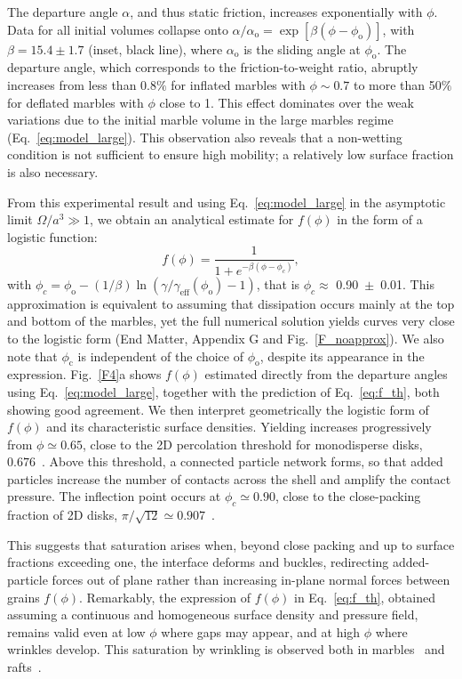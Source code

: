 \documentclass[twocolumn, prl,
 amsmath,amssymb,
 superscriptaddress,aps,
]{revtex4-2}
\begin{document}
The departure angle $\alpha$, and thus static friction, increases exponentially with $\phi$. Data for all initial volumes collapse onto $\alpha / \alpha_\mathrm{o} = \exp[\beta(\phi - \phi_\mathrm{o})]$, with $\beta = 15.4 \pm 1.7$ (inset, black line), where $\alpha_\mathrm{o}$ is the sliding angle at $\phi_\mathrm{o}$.
The departure angle, which corresponds to the friction-to-weight ratio, abruptly increases from less than 0.8$\%$ for inflated marbles with $\phi \sim 0.7$ to more than 50$\%$ for deflated marbles with $\phi$ close to 1.
This effect dominates over the weak variations due to the initial marble volume in the large marbles regime (Eq.~\ref{eq:model_large}). This observation also reveals that a non-wetting condition is not sufficient to ensure high mobility; a relatively low surface fraction is also necessary.

From this experimental result and using Eq.~\ref{eq:model_large} in the asymptotic limit $\Omega/a^3\gg 1$, we obtain an analytical estimate for $f(\phi)$ in the form of a logistic function:
\begin{equation}
    f(\phi) = \frac{1}{1+e^{-\beta(\phi-\phi_c)}} ,
    \label{eq:f_th}
\end{equation}
with $\phi_c = \phi_\mathrm{o} - (1/\beta)\ln\left( \gamma/\gamma_\mathrm{eff}(\phi_\mathrm{o})-1\right) $, that is $\phi_c \approx$ 0.90~$\pm$~0.01. This approximation is equivalent to assuming that dissipation occurs mainly at the top and bottom of the marbles, yet the full numerical solution yields curves very close to the logistic form (End Matter, Appendix G and Fig.~\ref{F_noapprox}).
We also note that $\phi_\mathrm{c}$ is independent of the choice of $\phi_\mathrm{o}$, despite its appearance in the expression.
Fig.~\ref{F4}a shows $f(\phi)$ estimated directly from the departure angles using Eq.~\ref{eq:model_large}, together with the prediction of Eq.~\ref{eq:f_th}, both showing good agreement.
We then interpret geometrically the logistic form of $f(\phi)$ and its characteristic surface densities.
Yielding increases progressively from $\phi\simeq0.65$, close to the 2D percolation threshold for monodisperse disks, $0.676$~\cite{quintanilla2000efficient}. Above this threshold, a connected particle network forms, so that added particles increase the number of contacts across the shell and amplify the contact pressure.
The inflection point occurs at $\phi_c\simeq0.90$, close to the close-packing fraction of 2D disks, $\pi/\sqrt{12}\simeq0.907$~\cite{toth2014regular}.

This suggests that saturation arises when, beyond close packing and up to surface fractions exceeding one, the interface deforms and buckles, redirecting added-particle forces out of plane rather than increasing in-plane normal forces between grains $f(\phi)$.
Remarkably, the expression of $f(\phi)$ in Eq.~\ref{eq:f_th}, obtained assuming a continuous and homogeneous surface density and pressure field, remains valid even at low $\phi$ where gaps may appear, and at high $\phi$ where wrinkles develop.
This saturation by wrinkling is observed both in marbles~\cite{lagubeau2014armoring} and rafts~\cite{vella2004elasticity,jambon2017wrinkles,protiere2023particle,prakash2024buckling}.
\end{document}
